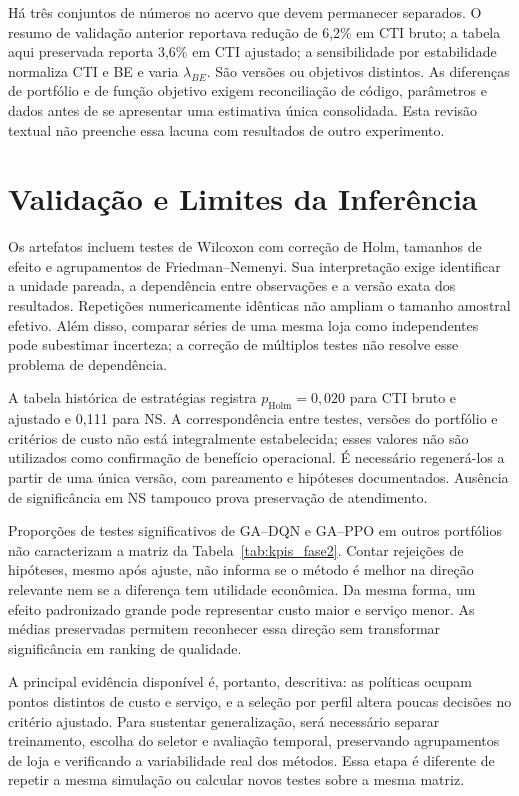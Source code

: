 Há três conjuntos de números no acervo que devem permanecer separados. O resumo de validação anterior reportava redução de 6,2\% em CTI bruto; a tabela aqui preservada reporta 3,6\% em CTI ajustado; a sensibilidade por estabilidade normaliza CTI e BE e varia $\lambda_{BE}$. São versões ou objetivos distintos. As diferenças de portfólio e de função objetivo exigem reconciliação de código, parâmetros e dados antes de se apresentar uma estimativa única consolidada. Esta revisão textual não preenche essa lacuna com resultados de outro experimento.

\section{Validação e Limites da Inferência}
\label{sec:stats}

Os artefatos incluem testes de Wilcoxon com correção de Holm, tamanhos de efeito e agrupamentos de Friedman--Nemenyi. Sua interpretação exige identificar a unidade pareada, a dependência entre observações e a versão exata dos resultados. Repetições numericamente idênticas não ampliam o tamanho amostral efetivo. Além disso, comparar séries de uma mesma loja como independentes pode subestimar incerteza; a correção de múltiplos testes não resolve esse problema de dependência.

A tabela histórica de estratégias registra $p_{\mathrm{Holm}}=0{,}020$ para CTI bruto e ajustado e 0,111 para NS. A correspondência entre testes, versões do portfólio e critérios de custo não está integralmente estabelecida; esses valores não são utilizados como confirmação de benefício operacional. É necessário regenerá-los a partir de uma única versão, com pareamento e hipóteses documentados. Ausência de significância em NS tampouco prova preservação de atendimento.

Proporções de testes significativos de GA--DQN e GA--PPO em outros portfólios não caracterizam a matriz da Tabela~\ref{tab:kpis_fase2}. Contar rejeições de hipóteses, mesmo após ajuste, não informa se o método é melhor na direção relevante nem se a diferença tem utilidade econômica. Da mesma forma, um efeito padronizado grande pode representar custo maior e serviço menor. As médias preservadas permitem reconhecer essa direção sem transformar significância em ranking de qualidade.

A principal evidência disponível é, portanto, descritiva: as políticas ocupam pontos distintos de custo e serviço, e a seleção por perfil altera poucas decisões no critério ajustado. Para sustentar generalização, será necessário separar treinamento, escolha do seletor e avaliação temporal, preservando agrupamentos de loja e verificando a variabilidade real dos métodos. Essa etapa é diferente de repetir a mesma simulação ou calcular novos testes sobre a mesma matriz.

